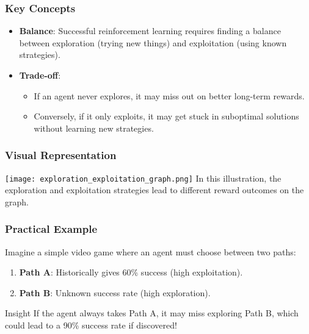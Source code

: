 \documentclass[aspectratio=169]{beamer}
\begin{document}
\begin{frame}[fragile]
    \frametitle{Key Concepts}
    \begin{itemize}
        \item \textbf{Balance}: Successful reinforcement learning requires finding a balance between exploration (trying new things) and exploitation (using known strategies).
        
        \item \textbf{Trade-off}: 
        \begin{itemize}
            \item If an agent never explores, it may miss out on better long-term rewards.
            \item Conversely, if it only exploits, it may get stuck in suboptimal solutions without learning new strategies.
        \end{itemize}
    \end{itemize}
\end{frame}

\begin{frame}[fragile]
    \frametitle{Visual Representation}
    \centering
    \texttt{[image: exploration\_exploitation\_graph.png]} %
    \footnotesize{In this illustration, the exploration and exploitation strategies lead to different reward outcomes on the graph.}
\end{frame}

\begin{frame}[fragile]
    \frametitle{Practical Example}
    Imagine a simple video game where an agent must choose between two paths:
    \begin{enumerate}
        \item \textbf{Path A}: Historically gives 60\% success (high exploitation).
        \item \textbf{Path B}: Unknown success rate (high exploration).
    \end{enumerate}
    \begin{block}{Insight}
        If the agent always takes Path A, it may miss exploring Path B, which could lead to a 90\% success rate if discovered!
    \end{block}    
\end{frame}
\end{document}
